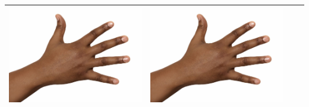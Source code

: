 \begin{longtable}{|N||c|c|c|}
\begin{minipage}{.29\textwidth}
      \includegraphics[width=\textwidth,height=\textheight,keepaspectratio]{images/test/hand_dark}
    \end{minipage} & 
    \begin{minipage}{.29\textwidth}
      \includegraphics[width=\textwidth,height=\textheight,keepaspectratio]{images/test/hand_dark}
    \end{minipage} \\
  \hline
 \end{longtable}